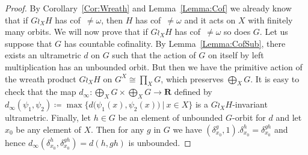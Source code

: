 \documentclass[a4paper]{article}
\theoremstyle{definition}
\newcommand{\setst}[2]{\{#1\ |\ #2\}}
\begin{document}
\begin{proof}
By Corollary~\ref{Cor:Wreath} and Lemma~\ref{Lemma:Cof} we already know that if $G \wr_X H$ has cof~$\neq\omega$, then $H$ has cof~$\neq\omega$ and it acts on $X$ with finitely many orbits.
We will now prove that if $G \wr_X H$ has cof~$\neq\omega$ so does $G$.
Let us suppose that $G$ has countable cofinality. By Lemma~\ref{Lemma:CofSub}, there exists an ultrametric $d$ on $G$ such that the action of $G$ on itself by left multiplication has an unbounded orbit.
But then we have the primitive action of the wreath product $G\wr_XH$ on $G^X\cong\prod_XG$,
which preserves $\bigoplus_XG$.
It is easy to check that the map $d_\infty\colon\bigoplus_XG\times\bigoplus_XG\to\mathbf R$ defined by $d_\infty(\psi_1,\psi_2)\coloneqq\max\setst{d\bigl(\psi_1(x),\psi_2(x)\bigr)}{x\in X}$ is a $G\wr_XH$-invariant ultrametric.
Finally, let $h\in G$ be an element of unbounded $G$-orbit for $d$ and let $x_0$ be any element of $X$. Then for any $g$ in $G$ we have $(\delta_{x_0}^g,1).\delta_{x_0}^h=\delta_{x_0}^{gh}$ and hence $d_\infty(\delta_{x_0}^h,\delta_{x_0}^{gh})=d(h,gh)$ is unbounded.


\end{proof}
\end{document}
